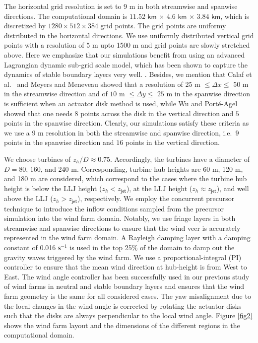 \documentclass[%
 aip,
 amsmath,amssymb,
preprint,%
author-numerical,%
]{revtex4-1}
\begin{document}
The horizontal grid resolution is set to 9 m in both streamwise and spanwise directions. The computational domain is $11.52$ $\mathsf{km}$ $\times$ $4.6$ $\mathsf{km}$ $\times$ $3.84$ $\mathsf{km}$, which is discretized by $1280\times512\times384$ grid points. The grid points are uniformy distributed in the horizontal directions. We use uniformly distributed vertical grid points with a resolution of $5$ $\text{m}$ upto 1500 m and grid points are slowly stretched above. Here we emphasize that our simulations benefit from using an advanced Lagrangian dynamic sub-grid scale model, which has been shown to capture the dynamics of stable boundary layers very well. \cite{sto08, nag19}. Besides, we mention that Calaf et al.\ \cite{cal10} and Meyers and Meneveau \cite{mey13} showed that a resolution of $25$ m $\leq \Delta{x} \leq$ $50$ m in the streamwise direction and of $10$ m $\leq \Delta{y}\leq$ $25$ m in the spanwise direction is sufficient when an actuator disk method is used, while Wu and Port\'e-Agel \cite{wu11} showed that one needs $8$ points across the disk in the vertical direction and $5$ points in the spanwise direction. Clearly, our simulations satisfy these criteria as we use a $9$ m resolution in both the streamwise and spanwise direction, i.e.\ $9$ points in the spanwise direction and $16$ points in the vertical direction.



We choose turbines of $z_h/D\approx0.75$. Accordingly, the turbines have a diameter of $D=80$, $160$, and $240$ m. Corresponding, turbine hub heights are 60 m, 120 m, and 180 m are considered, which correspond to the cases where the turbine hub height is below the LLJ height ($z_h < z_\mathsf{jet}$), at the LLJ height ($z_h{\approx}z_\mathsf{jet}$), and well above the LLJ ($z_h > z_\mathsf{jet}$), respectively. We employ the concurrent precursor technique \cite{ste14} to introduce the inflow conditions sampled from the precursor simulation into the wind farm domain. Notably, we use fringe layers in both streamwise and spanwise directions to ensure that the wind veer is accurately represented in the wind farm domain.
A Rayleigh damping layer\cite{kle78} with a damping constant of 0.016 $\mathsf{s}^{-1}$ is used in the top 25$\%$ of the domain to damp out the gravity waves triggered by the wind farm. We use a proportional-integral (PI) controller\cite{all15} to ensure that the mean wind direction at hub-height is from West to East. The wind angle controller has been successfully used in our previous study of wind farms in neutral and stable boundary layers \cite{nag19} and ensures that the wind farm geometry is the same for all considered cases. The yaw misalignment due to the local changes in the wind angle is corrected by rotating the actuator disks such that the disks are always perpendicular to the local wind angle. Figure \ref{fig2} shows the wind farm layout and the dimensions of the different regions in the computational domain.
\end{document}
